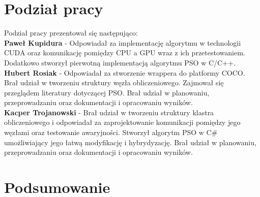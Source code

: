 \documentclass[12pt, twoside, openany, abstract=on]{report}
\theoremstyle{definition}
\begin{document}

\chapter{Podział pracy}
Podział pracy prezentował się następująco:\\

\textbf{Paweł Kupidura} - Odpowiadał za implementację algorytmu w technologii CUDA oraz komunikację pomiędzy CPU a GPU wraz z ich przetestowaniem. Dodatkowo stworzył pierwotną implementacją algorytmu PSO w C/C++.\\

\textbf{Hubert Rosiak} - Odpowiadał za stworzenie wrappera do platformy COCO. Brał udział w tworzeniu struktury węzła obliczeniowego. Zajmował się przeglądem literatury dotyczącej PSO. Brał udział w planowaniu, przeprowadzaniu oraz dokumentacji i opracowaniu wyników.\\

\textbf{Kacper Trojanowski} - Brał udział w tworzeniu struktury klastra obliczeniowego i odpowiadał za zaprojektowanie komunikacji pomiędzy jego węzłami oraz testowanie awaryjności. Stworzył algorytm PSO w C\# umożliwiający jego łatwą modyfikację i hybrydyzację. Brał udział w planowaniu, przeprowadzaniu oraz dokumentacji i opracowaniu wyników.


\chapter{Podsumowanie}



\end{document}
